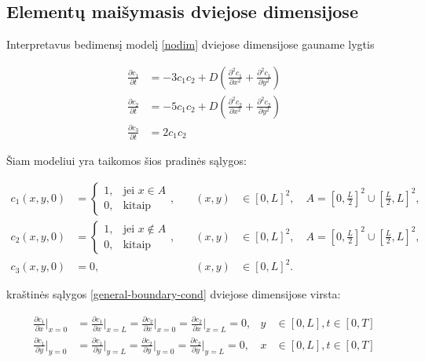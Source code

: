 \documentclass{VUMIFInfKursinis}
\begin{document}
\subsection{Elementų maišymasis dviejose dimensijose}

Interpretavus bedimensį modelį \eqref{nodim} dviejose dimensijose gauname lygtis

\begin{subequations} \label{rect}
    \begin{align}
    \frac{\partial c_1}{\partial t}&=-3c_1c_2+D\left(\frac{\partial^2c_1}{\partial x^2}+\frac{\partial^2c_1}{\partial y^2}\right)\\
    \frac{\partial c_2}{\partial t}&=-5c_1c_2+D\left(\frac{\partial^2c_2}{\partial x^2}+\frac{\partial^2c_2}{\partial y^2}\right)\\
    \frac{\partial c_3}{\partial t}&=2c_1c_2
    \end{align}
\end{subequations}

Šiam modeliui yra taikomos šios pradinės sąlygos:


\begin{equation} \label{intial-cond}
  \begin{aligned}
  c_1(x, y, 0) &= \begin{cases} 1, & \text{jei } x \in A \\ 0, & \text{kitaip} \end{cases}, 
  &\quad (x, y) &\in [0,L]^2, \quad A = \left[0,\tfrac{L}{2}\right]^2 \cup \left[\tfrac{L}{2},L\right]^2, \\
  c_2(x, y, 0) &= \begin{cases} 1, & \text{jei } x \notin A \\ 0, & \text{kitaip} \end{cases}, 
  &\quad (x, y) &\in [0,L]^2, \quad A = \left[0,\tfrac{L}{2}\right]^2 \cup \left[\tfrac{L}{2},L\right]^2, \\
  c_3(x, y, 0) &= 0, 
  &\quad (x, y) &\in [0,L]^2.
  \end{aligned}
  \end{equation}
  
kraštinės sąlygos \eqref{general-boundary-cond} dviejose dimensijose virsta:

\begin{equation} \label{boundary-cond}
\begin{split}
\frac{\partial c_1}{\partial x}\Big|_{x=0}&=\frac{\partial c_1}{\partial x}\Big|_{x=L}=\frac{\partial c_2}{\partial x}\Big|_{x=0}=\frac{\partial c_2}{\partial x}\Big|_{x=L}=0, &y&\in[0,L], t\in[0,T]\\
\frac{\partial c_1}{\partial y}\Big|_{y=0}&=\frac{\partial c_1}{\partial y}\Big|_{y=L}=\frac{\partial c_2}{\partial y}\Big|_{y=0}=\frac{\partial c_2}{\partial y}\Big|_{y=L}=0, &x&\in[0,L], t\in[0,T]
\end{split}
\end{equation}
\end{document}
